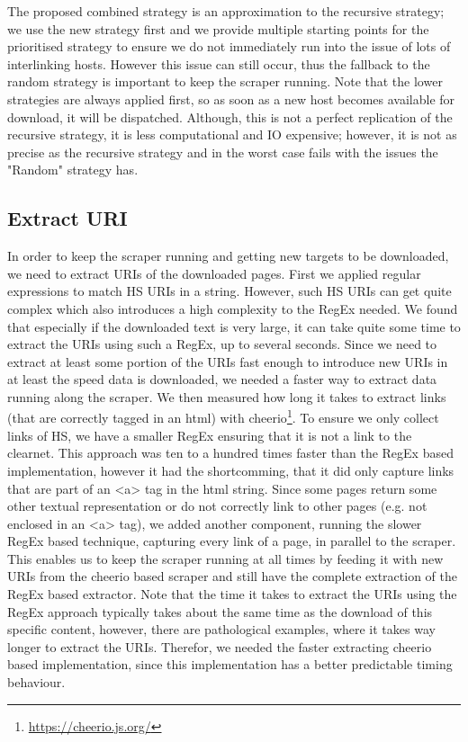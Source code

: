 \documentclass[USenglish,oneside,twocolumn]{article}
\begin{document}
\begin{itemize}
  The proposed combined strategy is an approximation to the recursive strategy; we use the new strategy first and we provide multiple starting points for the prioritised strategy to ensure we do not immediately run into the issue of lots of interlinking hosts. However this issue can still occur, thus the fallback to the random strategy is important to keep the scraper running. Note that the lower strategies are always applied first, so as soon as a new host becomes available for download, it will be dispatched. Although, this is not a perfect replication of the recursive strategy, it is less computational and IO expensive; however, it is not as precise as the recursive strategy and in the worst case fails with the issues the "Random" strategy has.
\end{itemize}
\subsection{Extract URI }
In order to keep the scraper running and getting new targets to be downloaded, we need to extract URIs of the downloaded pages. First we applied regular expressions to match HS URIs in a string. However, such HS URIs can get quite complex which also introduces a high complexity to the RegEx needed. We found that especially if the downloaded text is very large, it can take quite some time to extract the URIs using such a RegEx, up to several seconds. Since we need to extract at least some portion of the URIs fast enough to introduce new URIs in at least the speed data is downloaded, we needed a faster way to extract data running along the scraper. We then measured how long it takes to extract links (that are correctly tagged in an html) with cheerio\footnote{\href{https://cheerio.js.org/}{https://cheerio.js.org/}}. To ensure we only collect links of HS, we have a smaller RegEx ensuring that it is not a link to the clearnet. This approach was ten to a hundred times faster than the RegEx based implementation, however it had the shortcomming, that it did only capture links that are part of an <a> tag in the html string. Since some pages return some other textual representation or do not correctly link to other pages (e.g. not enclosed in an <a> tag), we added another component, running the slower RegEx based technique, capturing every link of a page, in parallel to the scraper. This enables us to keep the scraper running at all times by feeding it with new URIs from the cheerio based scraper and still have the complete extraction of the RegEx based extractor. Note that the time it takes to extract the URIs using the RegEx approach typically takes about the same time as the download of this specific content, however, there are pathological examples, where it takes way longer to extract the URIs. Therefor, we needed the faster extracting cheerio based implementation, since this implementation has a better predictable timing behaviour.
\end{document}
